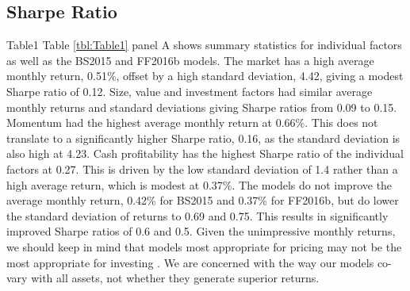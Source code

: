 
\subsection{Sharpe Ratio}

{Table1}
Table \ref{tbl:Table1} panel A shows summary statistics for individual factors as well as
the  BS2015 and FF2016b models. The market has a high average monthly return, 0.51\%,
offset by a high standard deviation,  4.42, giving a modest Sharpe ratio of 0.12. Size,
value and investment factors had similar average monthly returns and standard deviations
giving Sharpe ratios from 0.09 to 0.15. Momentum had the highest average monthly return at
0.66\%. This does not translate to a significantly higher Sharpe ratio, 0.16, as the
standard  deviation is also high at 4.23. Cash profitability has the highest Sharpe ratio
of the individual factors at 0.27. This is driven by the low standard deviation of 1.4
rather than a high average return, which  is modest at 0.37\%. The models do not improve
the average monthly return, 0.42\% for BS2015 and 0.37\% for  FF2016b, but do lower the
standard deviation of returns to 0.69 and 0.75. This results in significantly improved
Sharpe ratios of 0.6 and 0.5. Given the unimpressive monthly returns, we should keep in
mind that models most  appropriate for pricing may not be the most appropriate for
investing  \parencite{pastor2000comparing}. We are concerned with the way our models co-
vary with all assets, not whether they  generate superior returns.

